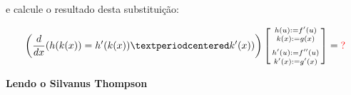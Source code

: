 \documentclass[oneside,12pt]{article}
\begin{document}
\ssk

e calcule o resultado desta substituição:

$$\left(
  \ddx (h(k(x)) = h'(k(x))·k'(x))
  \right)
  \bsm{
    h(u) := f'(u) \\
    k(x) := g(x) \\[5pt]
    h'(u) := f''(u) \\
    k'(x) := g'(x) \\
  }
  = \ColorRed{?}
$$





\newpage

%                                                   

{\bf Lendo o Silvanus Thompson}
\end{document}
